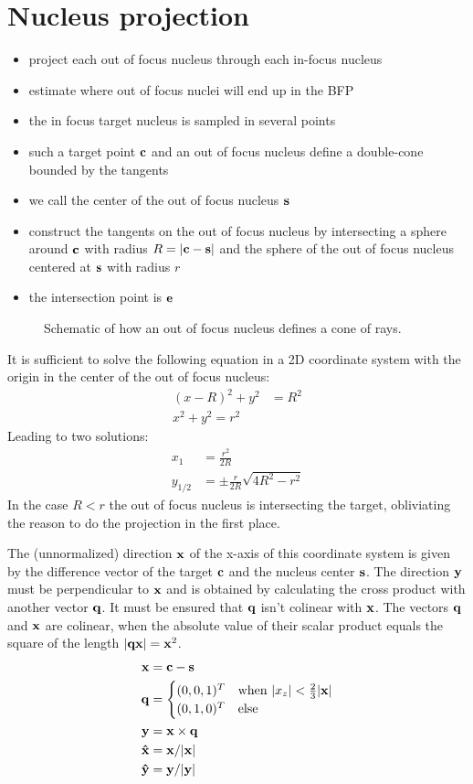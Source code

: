 \section{Nucleus projection}
\begin{itemize}
\item project each out of focus nucleus through each in-focus nucleus 
\item estimate where out of focus nuclei will end up in the BFP
\item the in focus target nucleus is sampled in several points
\item such a target point $\mathbf{c}$ and an out of focus nucleus define a
  double-cone bounded by the tangents
\item we call the center of the out of focus nucleus $\mathbf{s}$
\item construct the tangents on the out of focus nucleus by
  intersecting a sphere around $\mathbf{c}$ with radius $R=\mathopen| \mathbf{c}-\mathbf{s} \mathclose|$ and
  the sphere of the out of focus nucleus centered at $\mathbf{s}$ with radius
  $r$
\item the intersection point is $\mathbf{e}$
\end{itemize}

\begin{figure}[!hbt]
  \centering
  
  \caption{Schematic of how an out of focus nucleus defines a cone of
    rays.}
\end{figure}
It is sufficient to solve the following equation in a 2D coordinate
system with the origin in the center of the out of focus nucleus:
\begin{align}
  (x-R)^2+y^2&=R^2\\
  x^2+y^2=r^2
\end{align}
Leading to two solutions:
\begin{align}
  x_1&=\frac{r^2}{2R}\\
  y_{1/2}&=\pm\frac{r}{2R}\sqrt{4R^2-r^2}
\end{align}
In the case $R<r$ the out of focus nucleus is intersecting the target,
obliviating the reason to do the projection in the first place.

The (unnormalized) direction $\mathbf{x}$ of the x-axis of this coordinate
system is given by the difference vector of the target $\mathbf{c}$ and the
nucleus center $\mathbf{s}$. The direction $\mathbf{y}$ must be perpendicular to $\mathbf{x}$
and is obtained by calculating the cross product with another vector
$\mathbf{q}$.  It must be ensured that $\mathbf{q}$ isn't colinear with $\mathbf{x}$. The
vectors $\mathbf{q}$ and $\mathbf{x}$ are colinear, when the absolute value of their
scalar product equals the square of the length $\mathopen| \mathbf{q}\mathbf{x} \mathclose|=\mathbf{x}^2$.
\begin{align}
  \mathbf{x}&=\mathbf{c}-\mathbf{s}\\
  \mathbf{q}&=\begin{cases}
    (0,0,1)^T & \textrm{when}\ \mathopen| x_z \mathclose|<\frac{2}{3}\mathopen| \mathbf{x} \mathclose|\\
    (0,1,0)^T & \textrm{else}
  \end{cases}\\
  \mathbf{y}&=\mathbf{x}\times\mathbf{q} \\
  \mathbf{\hat{x}}&=\mathbf{x}/\mathopen| \mathbf{x} \mathclose|\\
  \mathbf{\hat{y}}&=\mathbf{y}/\mathopen| \mathbf{y} \mathclose|
\end{align}
